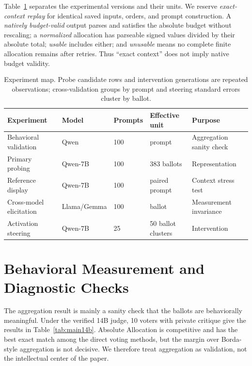 \documentclass[11pt]{article}
\begin{document}
Table~\ref{tab:experimentmap} separates the experimental versions and their
units. We reserve \emph{exact-context replay} for identical saved inputs,
orders, and prompt construction. A \emph{natively budget-valid} output parses
and satisfies the absolute budget without rescaling; a \emph{normalized}
allocation has parseable signed values divided by their absolute total;
\emph{usable} includes either; and \emph{unusable} means no complete finite
allocation remains after retries. Thus ``exact context'' does not imply native
budget validity.

\begin{table}[h]
\centering
\small
\begin{tabular}{p{1.15in}p{0.65in}p{0.55in}p{1.05in}p{2.15in}}
\toprule
Experiment & Model & Prompts & Effective unit & Purpose \\
\midrule
Behavioral validation & Qwen & 100 & prompt & Aggregation sanity check \\
Primary probing & Qwen-7B & 100 & 383 ballots & Representation \\
Reference display & Qwen-7B & 100 & paired prompt & Context stress test \\
Cross-model elicitation & Llama/Gemma & 100 & ballot & Measurement invariance \\
Activation steering & Qwen-7B & 25 & 50 ballot clusters & Intervention \\
\bottomrule
\end{tabular}
\caption{Experiment map. Probe candidate rows and intervention generations are
repeated observations; cross-validation groups by prompt and steering standard
errors cluster by ballot.}
\label{tab:experimentmap}
\end{table}

\section{Behavioral Measurement and Diagnostic Checks}

The aggregation result is mainly a sanity check that the ballots are
behaviorally meaningful. Under the verified 14B judge, 10 voters with private
critique give the results in Table~\ref{tab:main14b}. Absolute Allocation is
competitive and has the best exact match among the direct voting methods, but
the margin over Borda-style aggregation is not decisive. We therefore treat
aggregation as validation, not the intellectual center of the paper.
\end{document}
